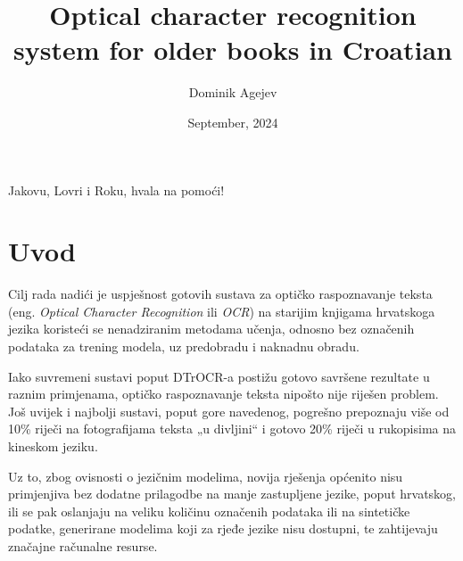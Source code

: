 \documentclass[zavrsnirad]{fer}
\title{Optical character recognition system for older books in Croatian}
\author{Dominik Agejev}
\date{September, 2024}
\begin{document}
\maketitle






\begin{zahvale}
  Jakovu, Lovri i Roku,
  hvala na pomoći!
\end{zahvale}


\mainmatter


\tableofcontents


\chapter{Uvod}
\label{pog:uvod}

Cilj rada nadići je uspješnost gotovih sustava za optičko raspoznavanje teksta (eng. \textit{Optical Character Recognition} ili \textit{OCR}) na starijim knjigama hrvatskoga jezika koristeći se nenadziranim metodama učenja, odnosno bez označenih podataka za trening modela, uz predobradu i naknadnu obradu.

Iako suvremeni sustavi poput DTrOCR-a \cite{Fujitake2023} postižu gotovo savršene rezultate u raznim primjenama, optičko raspoznavanje teksta  nipošto nije riješen problem. Još uvijek i najbolji sustavi, poput gore navedenog, pogrešno prepoznaju više od 10\% riječi na fotografijama teksta „u divljini“ i gotovo 20\% riječi u rukopisima na kineskom jeziku.

Uz to, zbog ovisnosti o jezičnim modelima, novija rješenja općenito nisu primjenjiva bez dodatne prilagodbe na manje zastupljene jezike, poput hrvatskog, ili se pak oslanjaju na veliku količinu označenih podataka ili na sintetičke podatke, generirane modelima koji za rjeđe jezike nisu dostupni, te zahtijevaju značajne računalne resurse.
\end{document}
